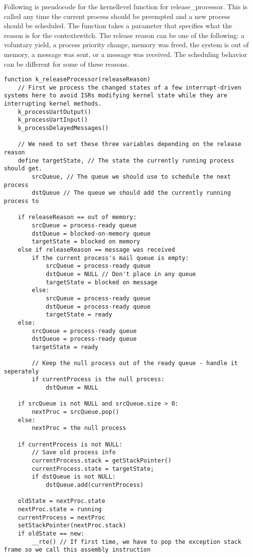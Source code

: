 \documentclass[12pt]{report}
\begin{document}
Following is pseudo\-code for the kernel\-level function for release\_processor. This is called any time the current process should be preempted and a new process should be scheduled. The function takes a parameter that specifies what the reason is for the context\-switch. The release reason can be one of the following: a voluntary yield, a process priority change, memory was freed, the system is out of memory, a message was sent, or a message was received. The scheduling behavior can be different for some of these reasons.

\begin{lstlisting}
function k_releaseProcessor(releaseReason)
    // First we process the changed states of a few interrupt-driven systems here to avoid ISRs modifying kernel state while they are interrupting kernel methods.
    k_processUartOutput()
    k_processUartInput()
    k_processDelayedMessages()

    // We need to set these three variables depending on the release reason
    define targetState, // The state the currently running process should get.
        srcQueue, // The queue we should use to schedule the next process
        dstQueue // The queue we should add the currently running process to

    if releaseReason == out of memory:
        srcQueue = process-ready queue
        dstQueue = blocked-on-memory queue
        targetState = blocked on memory
    else if releaseReason == message was received
        if the current process's mail queue is empty:
            srcQueue = process-ready queue
            dstQueue = NULL // Don't place in any queue
            targetState = blocked on message
        else:
            srcQueue = process-ready queue
            dstQueue = process-ready queue
            targetState = ready
    else:
        srcQueue = process-ready queue
        dstQueue = process-ready queue
        targetState = ready

        // Keep the null process out of the ready queue - handle it seperately
        if currentProcess is the null process:
            dstQueue = NULL

    if srcQueue is not NULL and srcQueue.size > 0:
        nextProc = srcQueue.pop()
    else:
        nextProc = the null process

    if currentProcess is not NULL:
        // Save old process info
        currentProcess.stack = getStackPointer()
        currentProcess.state = targetState;
        if dstQueue is not NULL:
            dstQueue.add(currentProcess)

    oldState = nextProc.state
    nextProc.state = running
    currentProcess = nextProc
    setStackPointer(nextProc.stack)
    if oldState == new:
        __rte() // If first time, we have to pop the exception stack frame so we call this assembly instruction
\end{lstlisting}
\end{document}
